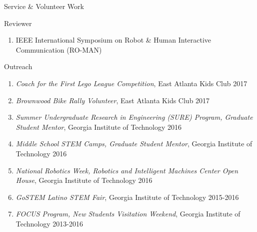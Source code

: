 \documentclass{resume} %
\newcommand{\sectionspace}{\vspace{3mm}}
\newcommand{\simplelistentry}[3]{\textit{#1}, {#2} \hfill {#3}}
\begin{document}


\sectionspace

\begin{rSection}{Service \& Volunteer Work}

\begin{rSubsection}{Reviewer}{}{}{}
\item
\begin{enumerate}
\item IEEE International Symposium on Robot \& Human Interactive Communication (RO-MAN)
\end{enumerate}
\end{rSubsection}



\begin{rSubsection}{Outreach}{}{}{}
\item
\begin{enumerate}

\item \simplelistentry{Coach for the First Lego League Competition}{East Atlanta
    Kids Club}{2017}

\item \simplelistentry{Brownwood Bike Rally Volunteer}{East Atlanta Kids
    Club}{2017}

\item \simplelistentry{Summer Undergraduate Research in Engineering (SURE)
    Program, Graduate Student Mentor}{Georgia Institute of Technology}{2016}

\item \simplelistentry{Middle School STEM Camps, Graduate Student
    Mentor}{Georgia Institute of Technology}{2016}

\item \simplelistentry{National Robotics Week, Robotics and Intelligent Machines
    Center Open House}{Georgia Institute of Technology}{2016}

\item \simplelistentry{GoSTEM Latino STEM Fair}{Georgia Institute of
    Technology}{2015-2016}

\item \simplelistentry{FOCUS Program, New Students Visitation Weekend}{Georgia
    Institute of Technology}{2013-2016}


\end{enumerate}
\end{rSubsection}
\end{rSection}
\end{document}
